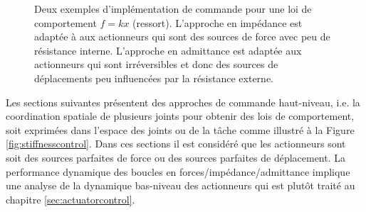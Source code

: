\begin{figure}[H]
				\vspace{-10pt}
        \centering
				\hspace{5pt}
        \caption{Deux exemples d'implémentation de commande pour une loi de comportement $f=kx$ (ressort). L'approche en impédance est adaptée à aux actionneurs qui sont des sources de force avec peu de résistance interne. L'approche en admittance est adaptée aux actionneurs qui sont irréversibles et donc des sources de déplacements peu influencées par la résistance externe.}
				\label{fig:impedanceadmitancesex}
\end{figure}

Les sections suivantes présentent des approches de commande haut-niveau, i.e. la coordination spatiale de plusieurs joints pour obtenir des lois de comportement, soit exprimées dans l'espace des joints ou de la tâche comme illustré à la Figure \ref{fig:stiffnesscontrol}. Dans ces sections il est considéré que les actionneurs sont soit des sources parfaites de force ou des sources parfaites de déplacement. La performance dynamique des boucles en forces/impédance/admittance implique une analyse de la dynamique bas-niveau des actionneurs qui est plutôt traité au chapitre \ref{sec:actuatorcontrol}. 

